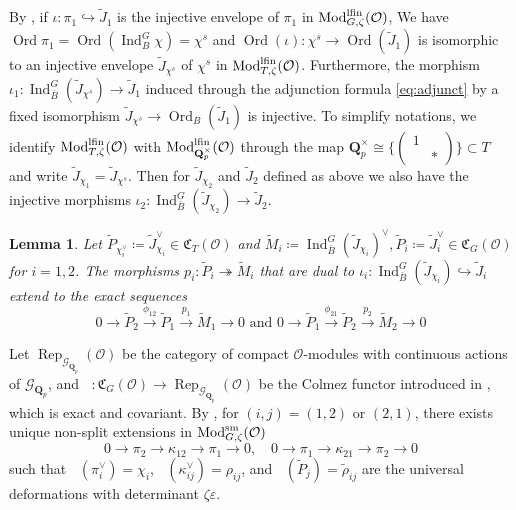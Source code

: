 \documentclass[leqno]{amsart}
\newcommand{\smat}[1]{\left( \begin{smallmatrix} #1 \end{smallmatrix} \right)}
\newcommand{\lfMod}{\textnormal{Mod}^{\textnormal{lfin}}}
\DeclareMathOperator{\Mod}{\textnormal{Mod}}
\DeclareMathOperator{\Rep}{Rep}
\newcommand{\fC}{\mathfrak{C}}
\DeclareMathOperator{\V}{\check{\mathbf{V}}} %
\newcommand{\Gp}{\mathcal{G}_{\Qp}} %
\DeclareMathOperator{\Ord}{Ord}
\newcommand{\sm}{\textnormal{sm}}
\newcommand{\Qp}{\mathbf{Q}_p}
\newcommand{\oo}{\mathcal{O}} %
\DeclareMathOperator{\Ind}{Ind}
\newtheorem{lem}[thm]{Lemma}
\theoremstyle{definition}
\theoremstyle{remark}
\begin{document}
By \cite[Prop 7.1]{pask},
if $\iota\colon \pi_1\hookrightarrow \tilde{J}_1$
is the injective envelope of $\pi_1$
in $\lfMod_{G,\zeta}(\oo)$,
We have $\Ord\pi_1=\Ord(\Ind_B^G\chi)=\chi^s$
and $\Ord(\iota)\colon \chi^s \to \Ord(\tilde{J}_1)$
is isomorphic to an injective envelope
$\tilde{J}_{\chi^s}$ of $\chi^s$
in $\lfMod_{T,\zeta}(\oo)$.
Furthermore, the morphism 
$\iota_1\colon \Ind_{\bar{B}}^G(\tilde{J}_{\chi^s})\to
\tilde{J}_1$
induced through the adjunction formula \eqref{eq:adjunct}
by a fixed isomorphism
$\tilde{J}_{\chi^s}\to \Ord_B(\tilde{J}_1)$
is injective.
To simplify notations,
we identify $\lfMod_{T,\zeta}(\oo)$
with $\lfMod_{\Qp^\times}(\oo)$ through 
the map $\Qp^\times\cong \{\smat{1&\\&*}\}\subset T$
and write $\tilde{J}_{\chi_1}=\tilde{J}_{\chi^s}$.
Then for $ \tilde{J}_{\chi_2}$
and $ \tilde{J}_2$ defined as above
we also have the injective morphisms
$\iota_2\colon \Ind_{\bar{B}}^G(\tilde{J}_{\chi_2})\to
\tilde{J}_2$.


\begin{lem}\cite[Cor 7.7]{pask}
Let $\tilde{P}_{\chi_i^\vee}\coloneqq \tilde{J}_{\chi_i}^\vee
\in\fC_T(\oo)$ and
$\tilde{M}_i\coloneqq 
\Ind_{\bar{B}}^G(\tilde{J}_{\chi_i})^\vee,
\tilde{P}_i\coloneqq \tilde{J}_i^\vee\in\fC_G(\oo)$
for $i=1,2$.
The morphisms
$p_i\colon \tilde{P}_i\twoheadrightarrow \tilde{M}_i$
that are dual to
$\iota_i\colon 
\Ind_{\bar{B}}^G(\tilde{J}_{\chi_i})\hookrightarrow 
\tilde{J}_i$ 
extend to the exact sequences
\begin{equation}\label{eq:exact_PPM}
	0\to \tilde{P}_{2}\xrightarrow{\phi_{12}} 
	\tilde{P}_{1}\xrightarrow{p_1} \tilde{M}_1\to 0 
	\text{ and }
	0\to \tilde{P}_{1}\xrightarrow{\phi_{21}} 
	\tilde{P}_{2}\xrightarrow{p_2} \tilde{M}_2\to 0
\end{equation}
\end{lem}

Let $\Rep_{\Gp}(\oo)$
be the category of compact $\oo$-modules with
continuous actions of $\Gp$,
and $\V\colon \fC_G(\oo)\to \Rep_{\Gp}(\oo)$
be the Colmez functor introduced 
in \cite[\S 5.7]{pask},
which is exact and covariant.
By \cite[Cor 8.7]{pask},
for $(i,j)=(1,2)$ or  $(2,1)$,
there exists unique non-split extensions
in $\Mod^{\sm}_{G,\zeta}(\oo)$ 
\[
	0\to \pi_2\to \kappa_{12}\to \pi_1\to 0,\quad
	0\to \pi_1\to \kappa_{21}\to \pi_2\to 0
\]
such that
$\V(\pi_i^\vee)=\chi_i$, $\V(\kappa_{ij}^\vee)=\rho_{ij}$,
and $\V(\tilde{P}_j)=\tilde{\rho}_{ij}$
are the universal deformations
with determinant $\zeta\varepsilon$.
\end{document}
